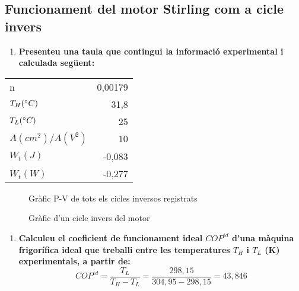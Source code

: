 \documentclass[a4paper]{article}
\begin{document}
\subsection{Funcionament del motor Stirling com a cicle invers}

\begin{enumerate}[resume]
	\item \textbf{Presenteu una taula que contingui la informació experimental i calculada següent:}
\end{enumerate}
\begin{table}[H]
	\centering
	\begin{tabular}{l|r}
		n &  0,00179 \\ 
		$T_H (\degree C)$ & 31,8 \\  
		$T_L (\degree C)$ & 25 \\ 
		$A(cm^2)/A(V^2)$ & 10 \\ 
		$W_t(J)$ & -0,083 \\ 
		$\dot{W}_t (W)$ & -0,277 \\
	\end{tabular}
\end{table}

\begin{figure}[H]
	\centering
	\caption{Gràfic P-V de tots els cicles inversos registrats}
\end{figure}

\begin{figure}[H]
	\centering
	\caption{Gràfic d'un cicle invers del motor}
\end{figure}

\begin{enumerate}[resume]
	\item \textbf{Calculeu el coeficient de funcionament ideal $COP^{id}$ d'una màquina frigorífica ideal que treballi entre les temperatures $T_H$ i $T_L$ (K) experimentals, a partir de: }
	$$
	COP^{id} = \frac{T_L}{T_H - T_L} = \frac{298,15}{304,95 - 298,15} = \boxed{43,846}
	$$
\end{enumerate}
\end{document}
